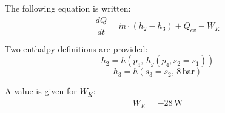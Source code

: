 The following equation is written:  
\[
\frac{d\dot{Q}}{dt} = \dot{m} \cdot (h_2 - h_3) + \dot{Q}_{ev} - \dot{W}_K
\]  

Two enthalpy definitions are provided:  
\[
h_2 = h(p_4, \, h_g(p_4, s_2 = s_1))
\]  
\[
h_3 = h(s_3 = s_2, \, 8 \, \text{bar})
\]  

A value is given for \( \dot{W}_K \):  
\[
\dot{W}_K = -28 \, \text{W}
\]
